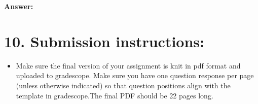 \documentclass[
]{article}
\providecommand{\tightlist}{%
  \setlength{\itemsep}{0pt}\setlength{\parskip}{0pt}}
\begin{document}
\textbf{Answer:}

\hypertarget{submission-instructions}{%
\section{10. Submission instructions:}\label{submission-instructions}}

\begin{itemize}
\tightlist
\item
  Make sure the final version of your assignment is knit in pdf format
  and uploaded to gradescope. Make sure you have one question response
  per page (unless otherwise indicated) so that question positions align
  with the template in gradescope.The final PDF should be 22 pages long.
\end{itemize}
\end{document}
